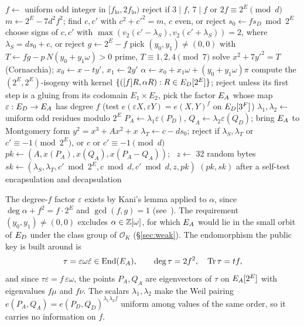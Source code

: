 \begin{algorithm}[h]
\caption[$\textsf{KeyGen}()$]{$\textsf{KeyGen}()$}\label{alg:keygen}
\begin{algorithmic}[1]
\Repeat {}
  \State $f\gets$ uniform odd integer in $[f_{\mathrm{lo}},2f_{\mathrm{lo}})$
  \State reject if $3\mid f$, $7\mid f$ or $2f\equiv 2^E\pmod d$
  \State $m\gets 2^E-7d^2f^2$; find $c,c'$ with $c^2+c'^2=m$, $c$ even, or reject
  \State $s_0\gets f s_D \bmod 2^E$
  \State choose signs of $c,c'$ with $\max(v_2(c'-\lambda_S),v_2(c'+\lambda_S))=2$, where $\lambda_S=ds_0+c$, or reject
\State $g\gets 2^E-f$
\Repeat {}
  \State pick $(y_0,y_1)\ne(0,0)$ with $T\gets fg-p\,N(y_0+y_1\omega)>0$ prime, $T\equiv1,2,4\pmod7$
  \State solve $x^2+7y'^2=T$ (Cornacchia); $x_0\gets x-ty'$, $x_1\gets 2y'$
\State $\alpha\gets x_0+x_1\omega+(y_0+y_1\omega)\pi$ 
\State compute the $(2^E,2^E)$-isogeny with kernel $\{([f]R,\alpha R):R\in E_D[2^E]\}$; reject unless its first step is a gluing
\State from its codomain $E_1\times E_2$, pick the factor $E_A$ whose map $\varepsilon:E_D\to E_A$ has degree $f$ (test $e(\varepsilon X,\varepsilon Y)=e(X,Y)^f$ on $E_D[3^F]$)
\State $\lambda_1,\lambda_2\gets$ uniform odd residues modulo $2^E$
\State $P_A\gets\lambda_1\varepsilon(P_D)$, $Q_A\gets\lambda_2\varepsilon(Q_D)$; bring $E_A$ to Montgomery form $y^2=x^3+Ax^2+x$
\State $\lambda_T\gets c-ds_0$; reject if $\lambda_S,\lambda_T$ or $c'\equiv-1\pmod{2^E}$, or $c$ or $c'\equiv-1\pmod d$
\State $\mathit{pk}\gets(A,x(P_A),x(Q_A),x(P_A-Q_A))$; \ $z\gets$ 32 random bytes
\State $\mathit{sk}\gets(\lambda_S,\lambda_T,c'\bmod 2^E,c\bmod d,c'\bmod d,z,\mathit{pk})$
\State \Return $(\mathit{pk},\mathit{sk})$ after a self-test encapsulation and decapsulation
\end{algorithmic}
\end{algorithm}

The degree-$f$ factor $\varepsilon$ exists by Kani's lemma applied to
$\alpha$, since $\deg\alpha+f^2=f\cdot2^E$ and $\gcd(f,g)=1$
(see~\cite[\S2]{Rob23}). The requirement $(y_0,y_1)\ne(0,0)$ excludes
$\alpha\in\mathbb{Z}[\omega]$, for which $E_A$ would lie in the small orbit of $E_D$
under the class group of $\mathcal{O}_K$ (\S\ref{sec:weak}). The
endomorphism the public key is built around is
\[
\tau=\varepsilon\omega\hat\varepsilon\in\operatorname{End}(E_A),\qquad \deg\tau=2f^2,\quad \operatorname{Tr}\tau=tf,
\]
and since $\tau\varepsilon=f\,\varepsilon\omega$, the points
$P_A,Q_A$ are eigenvectors of $\tau$ on $E_A[2^E]$ with eigenvalues $f\mu$ and
$f\nu$. The scalars $\lambda_1,\lambda_2$ make the Weil pairing
$e(P_A,Q_A)=e(P_D,Q_D)^{\lambda_1\lambda_2 f}$ uniform among
values of the same order, so it carries no information on $f$.

